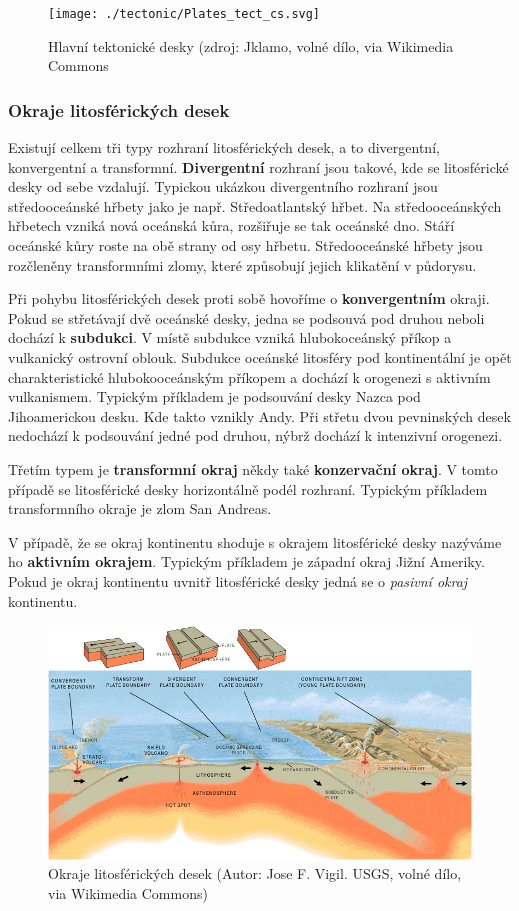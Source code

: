 \begin{figure}[h]
	\texttt{[image: ./tectonic/Plates\_tect\_cs.svg]}
	\caption{Hlavní tektonické desky (zdroj: Jklamo, volné dílo, via Wikimedia Commons}
\end{figure}

\subsubsection{Okraje litosférických desek}
Existují celkem tři typy rozhraní litosférických desek, a to divergentní, konvergentní a transformní. \textbf{Divergentní} rozhraní jsou takové, kde se litosférické desky od sebe vzdalují. Typickou ukázkou divergentního rozhraní jsou středooceánské hřbety jako je např. Středoatlantský hřbet. Na středooceánských hřbetech vzniká nová oceánská kůra, rozšiřuje se tak oceánské dno. Stáří oceánské kůry roste na obě strany od osy hřbetu. Středooceánské hřbety jsou rozčleněny transformními zlomy, které způsobují jejich klikatění v půdorysu. 

Při pohybu litosférických desek proti sobě hovoříme o \textbf{konvergentním} okraji. Pokud se střetávají dvě oceánské desky, jedna se podsouvá pod druhou neboli dochází k \textbf{subdukci}. V místě subdukce vzniká hlubokoceánský příkop a vulkanický ostrovní oblouk.  Subdukce oceánské litosféry pod kontinentální je opět charakteristické hlubokooceánským příkopem a dochází k orogenezi s aktivním vulkanismem. Typickým příkladem je podsouvání desky Nazca pod Jihoamerickou desku. Kde takto vznikly Andy. Při střetu dvou pevninských desek nedochází k podsouvání jedné pod druhou, nýbrž dochází k intenzivní orogenezi. 

Třetím typem je \textbf{transformní okraj} někdy také \textbf{konzervační okraj}. V tomto případě se litosférické desky horizontálně podél rozhraní. Typickým příkladem transformního okraje je zlom San Andreas.

V případě, že se okraj kontinentu shoduje s okrajem litosférické desky nazýváme ho \textbf{aktivním okrajem}. Typickým příkladem je západní okraj Jižní Ameriky. Pokud je okraj kontinentu uvnitř litosférické desky jedná se o \emph{pasivní okraj} kontinentu. 
\begin{figure}[h]
	\centering
	\includegraphics[width=1\linewidth]{obrazky/tectonic/Tectonic_plate_boundaries}
	\caption{Okraje litosférických desek (Autor: Jose F. Vigil. USGS, volné dílo, via Wikimedia Commons)}
	\label{fig:tectonicplateboundaries}
\end{figure}


